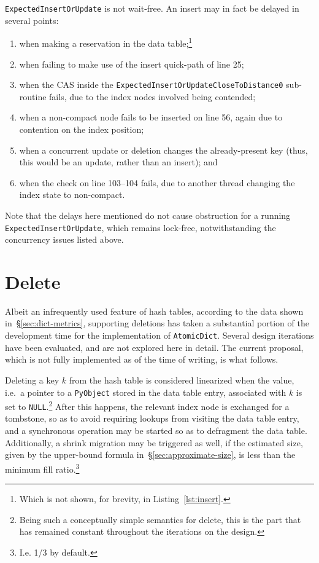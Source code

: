 \texttt{ExpectedInsertOrUpdate} is not wait-free.
An insert may in fact be delayed in several points:
\begin{enumerate}
	\item when making a reservation in the data table;\footnote{%
		Which is not shown, for brevity, in Listing~\ref{lst:insert}.
	}
	\item when failing to make use of the insert quick-path of line 25;
	\item when the CAS inside the \texttt{ExpectedInsertOrUpdateCloseToDistance0} sub-routine fails, due to the index nodes involved being contended;
	\item when a non-compact node fails to be inserted on line 56, again due to contention on the index position;
	\item when a concurrent update or deletion changes the already-present key (thus, this would be an update, rather than an insert); and
	\item when the check on line 103--104 fails, due to another thread changing the index state to non-compact.
\end{enumerate}
Note that the delays here mentioned do not cause obstruction for a running \texttt{ExpectedInsertOrUpdate}, which remains lock-free, notwithstanding the concurrency issues listed above.


\section{Delete}\label{sec:delete}

Albeit an infrequently used feature of hash tables, according to the data shown in~\S\ref{sec:dict-metrics}, supporting deletions has taken a substantial portion of the development time for the implementation of \texttt{AtomicDict}.
Several design iterations have been evaluated, and are not explored here in detail.
The current proposal, which is not fully implemented as of the time of writing, is what follows.

Deleting a key $k$ from the hash table is considered linearized when the value, i.e.\ a pointer to a \texttt{PyObject} stored in the data table entry, associated with $k$ is set to \texttt{NULL}.\footnote{%
	Being such a conceptually simple semantics for delete, this is the part that has remained constant throughout the iterations on the design.
}
After this happens, the relevant index node is exchanged for a tombstone, so as to avoid requiring lookups from visiting the data table entry, and a synchronous operation may be started so as to defragment the data table.
Additionally, a shrink migration may be triggered as well, if the estimated size, given by the upper-bound formula in~\S\ref{sec:approximate-size}, is less than the minimum fill ratio.\footnote{I.e. 1/3 by default.}

